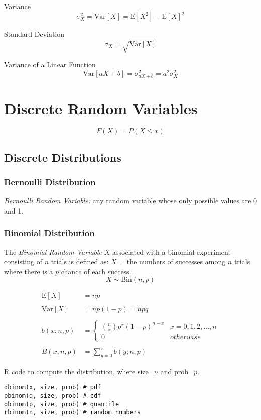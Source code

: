 \documentclass{article}
\begin{document}
Variance
$$ \sigma_X^2 = \mathrm{Var}[X] = \mathrm{E}[X^2] - \mathrm{E}[X]^2$$


Standard Deviation
$$ \sigma_X = \sqrt{\mathrm{Var}[X]}$$

Variance of a Linear Function
$$ \mathrm{Var}[aX + b] = \sigma^2_{aX+b} = a^2\sigma^2_X $$


\section*{Discrete Random Variables}
$$ F(X) = P(X \leq x) $$

\subsection*{Discrete Distributions}

\subsubsection*{Bernoulli Distribution}
\textit{Bernoulli Random Variable:} any random variable whose only possible values are 0 and 1.

\subsubsection*{Binomial Distribution}
The \textit{Binomial Random Variable} $X$ associated with a binomial experiment consisting of $n$ trials is defined as: $X$ = the numbers of successes among $n$ trials where there is a $p$ chance of each success.
$$ X \sim \mathrm{Bin}(n, p) $$

\begin{align*}
    \mathrm{E}[X] &= np \\ \\
    \mathrm{Var}[X] &= np(1-p) = npq \\ \\
    b(x; n, p) &=
    \begin{cases}
        \binom{n}{x} p^x (1-p)^{n-x} & x = 0, 1, 2, ..., n \\
        0 & otherwise
    \end{cases} \\ \\
    B(x; n, p) &= \sum_{y=0}^{x} b(y; n, p)
\end{align*}

R code to compute the distribution, where size=$n$ and prob=$p$.
\begin{lstlisting}
dbinom(x, size, prob) # pdf
pbinom(q, size, prob) # cdf
qbinom(p, size, prob) # quantile
rbinom(n, size, prob) # random numbers
\end{lstlisting}
\end{document}
